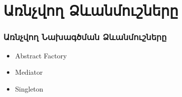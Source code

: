 \documentclass{beamer}
\begin{document}
\section{Առնչվող Ձևանմուշները}
\begin{frame}\frametitle{Առնչվող Նախագծման Ձևանմուշները}
\begin{itemize}
    \item Abstract Factory \vfill
    \item Mediator \vfill
    \item Singleton
\end{itemize}
\end{frame}
\end{document}
